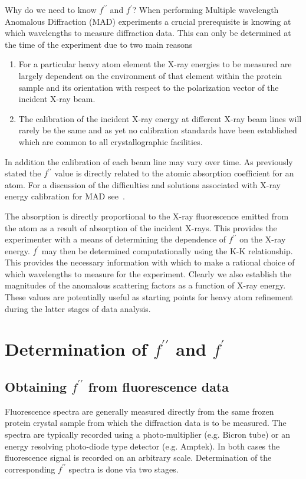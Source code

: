 \documentclass[a4]{article}
\begin{document}
Why do we need to know $f^{\prime\prime}$ and $f^{\prime}$?  When
performing Multiple wavelength Anomalous Diffraction (MAD) experiments
a crucial prerequisite is knowing at which wavelengths to measure
diffraction data. This can only be determined at the time of the
experiment due to two main reasons
\begin{enumerate}
\item For a particular heavy atom element the X-ray
energies to be measured are largely dependent on the environment of
that element within the protein sample and its orientation with
respect to the polarization vector of the incident X-ray beam.
\item The calibration of the incident X-ray energy at different X-ray beam lines
will rarely be the same and as yet no calibration standards have been
established which are common to all crystallographic facilities. 
\end{enumerate}
In addition the calibration of each beam line may vary over time.  As
previously stated the $f^{\prime\prime}$ value is directly related to
the atomic absorption coefficient for an atom. For a discussion of the
difficulties and solutions associated with X-ray energy calibration
for MAD see~\cite{Evans96}. 

The absorption is directly proportional to the X-ray fluorescence
emitted from the atom as a result of absorption of the incident
X-rays. This provides the experimenter with a means of determining the
dependence of $f^{\prime\prime}$ on the X-ray energy. $f^{\prime}$ may
then be determined computationally using the K-K relationship. This
provides the necessary information with which to make a rational
choice of which wavelengths to measure for the experiment. Clearly we
also establish the magnitudes of the anomalous scattering factors as a
function of X-ray energy. These values are potentially useful as
starting points for heavy atom refinement during the latter stages of
data analysis.

\section{Determination of $f^{\prime\prime}$ and $f^{\prime}$}
\subsection{Obtaining $f^{\prime\prime}$ from fluorescence data}

Fluorescence spectra are generally measured directly from the same
frozen protein crystal sample from which the diffraction data is to be
measured.  The spectra are typically recorded using a photo-multiplier
(e.g. Bicron tube) or an energy resolving photo-diode type detector
(e.g. Amptek). In both cases the fluorescence signal is recorded on an
arbitrary scale.  Determination of the corresponding
$f^{\prime\prime}$ spectra is done via two stages. 
\end{document}
